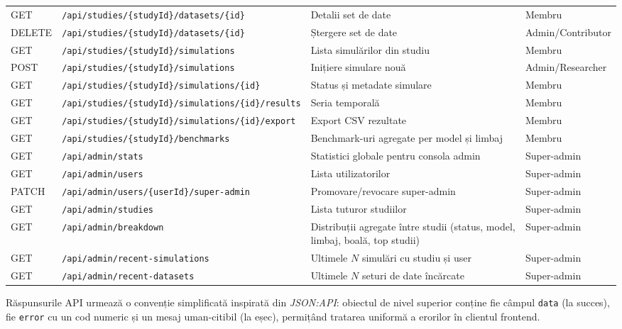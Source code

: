 \begin{table}[t]
\begin{tabularx}{\textwidth}{llXl}
GET    & \texttt{/api/studies/\{studyId\}/datasets/\{id\}} & Detalii set de date           & Membru \\
DELETE & \texttt{/api/studies/\{studyId\}/datasets/\{id\}} & Ștergere set de date          & Admin/Contributor \\
\midrule
GET    & \texttt{/api/studies/\{studyId\}/simulations} & Lista simulărilor din studiu      & Membru \\
POST   & \texttt{/api/studies/\{studyId\}/simulations} & Inițiere simulare nouă            & Admin/Researcher \\
GET    & \texttt{/api/studies/\{studyId\}/simulations/\{id\}} & Status și metadate simulare & Membru \\
GET    & \texttt{/api/studies/\{studyId\}/simulations/\{id\}/results} & Seria temporală       & Membru \\
GET    & \texttt{/api/studies/\{studyId\}/simulations/\{id\}/export} & Export CSV rezultate  & Membru \\
GET    & \texttt{/api/studies/\{studyId\}/benchmarks} & Benchmark-uri agregate per model și limbaj & Membru \\
\midrule
GET    & \texttt{/api/admin/stats}              & Statistici globale pentru consola admin  & Super-admin \\
GET    & \texttt{/api/admin/users}              & Lista utilizatorilor                     & Super-admin \\
PATCH  & \texttt{/api/admin/users/\{userId\}/super-admin} & Promovare/revocare super-admin & Super-admin \\
GET    & \texttt{/api/admin/studies}            & Lista tuturor studiilor                  & Super-admin \\
GET    & \texttt{/api/admin/breakdown}          & Distribuții agregate între studii (status, model, limbaj, boală, top studii) & Super-admin \\
GET    & \texttt{/api/admin/recent-simulations} & Ultimele $N$ simulări cu studiu și user  & Super-admin \\
GET    & \texttt{/api/admin/recent-datasets}    & Ultimele $N$ seturi de date încărcate    & Super-admin \\
\bottomrule
\end{tabularx}
\end{table}

Răspunsurile API urmează o convenție simplificată inspirată din
\emph{JSON:API}: obiectul de nivel superior conține fie câmpul \texttt{data}
(la succes), fie \texttt{error} cu un cod numeric și un mesaj uman-citibil
(la eșec), permițând tratarea uniformă a erorilor în clientul frontend.

